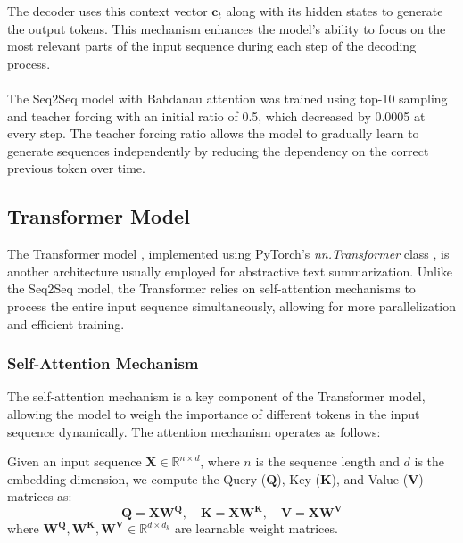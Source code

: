 \documentclass[a4papers, 11pt]{article}
\begin{document}
The decoder uses this context vector \( \mathbf{c}_t \) along with its hidden states to generate the output tokens. This mechanism enhances the model's ability to focus on the most relevant parts of the input sequence during each step of the decoding process.

\paragraph{}
The Seq2Seq model with Bahdanau attention was trained using top-10 sampling and teacher forcing with an initial ratio of 0.5, which decreased by 0.0005 at every step. The teacher forcing ratio allows the model to gradually learn to generate sequences independently by reducing the dependency on the correct previous token over time.

\subsection{Transformer Model}

The Transformer model \citep{vaswani2017attention}, implemented using PyTorch's \textit{nn.Transformer} class \citep{transformer}, is another architecture usually employed for abstractive text summarization. Unlike the Seq2Seq model, the Transformer relies on self-attention mechanisms to process the entire input sequence simultaneously, allowing for more parallelization and efficient training.

\subsubsection{Self-Attention Mechanism}

The self-attention mechanism is a key component of the Transformer model, allowing the model to weigh the importance of different tokens in the input sequence dynamically. The attention mechanism operates as follows:

Given an input sequence \(\mathbf{X} \in \mathbb{R}^{n \times d}\), where \(n\) is the sequence length and \(d\) is the embedding dimension, we compute the Query (\(\mathbf{Q}\)), Key (\(\mathbf{K}\)), and Value (\(\mathbf{V}\)) matrices as:
\begin{equation}
     \mathbf{Q} = \mathbf{X}\mathbf{W^Q}, \quad \mathbf{K} = \mathbf{XW^K}, \quad \mathbf{V} = \mathbf{XW^V}
\end{equation}
where \(\mathbf{W^Q}, \mathbf{W^K}, \mathbf{W^V} \in \mathbb{R}^{d \times d_k}\) are learnable weight matrices.
\end{document}
